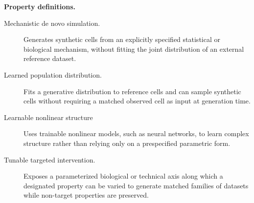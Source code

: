 \documentclass[11pt]{article}
\begin{document}
\noindent\textbf{Property definitions.}
\begin{description}
  \item[Mechanistic de novo simulation.] Generates synthetic cells from an
  explicitly specified statistical or biological mechanism, without fitting the
  joint distribution of an external reference dataset.
  \item[Learned population distribution.] Fits a generative distribution to
  reference cells and can sample synthetic cells without requiring a matched
  observed cell as input at generation time.
  \item[Learnable nonlinear structure] Uses trainable nonlinear models, such as
  neural networks, to learn complex structure rather than relying
  only on a prespecified parametric form.
  \item[Tunable targeted intervention.] Exposes a parameterized biological or
  technical axis along which a designated property can be varied to generate
  matched families of datasets while non-target properties are preserved.
\end{description}

\newpage



\end{document}
